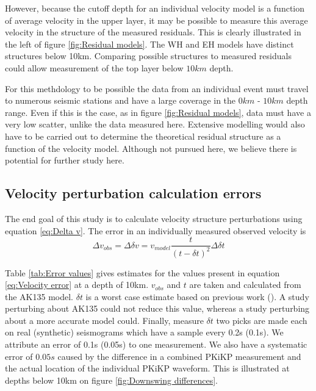 \documentclass[11pt,a4paper]{article}
\begin{document}
However, because the cutoff depth for an individual velocity model is a function of average velocity in the upper layer, it may be possible to measure this average velocity in the structure of the measured residuals. This is clearly illustrated in the left of figure \ref{fig:Residual models}. The WH and EH models have distinct structures below 10km. Comparing possible structures to measured residuals could allow measurement of the top layer below $10km$ depth.

For this methdology to be possible the data from an individual event must travel to numerous seismic stations and have a large coverage in the $0km$ - $10km$ depth range. Even if this is the case, as in figure \ref{fig:Residual models}, data must have a very low scatter, unlike the data measured here. Extensive modelling would also have to be carried out to determine the theoretical residual structure as a function of the velocity model. Although not pursued here, we believe there is potential for further study here.

\subsection{Velocity perturbation calculation errors}
\label{sec:Vel errors}
The end goal of this study is to calculate velocity structure perturbations using equation \eqref{eq:Delta v}. The error in an individually measured observed velocity is
\begin{equation}
	\Delta v_{obs} = \Delta \delta v = v_{model} \frac{t}{\left( t - \delta t\right )^{2}} \Delta \delta t 
	\label{eq:Velocity error}
\end{equation}

Table \ref{tab:Error values} gives estimates for the values present in equation \eqref{eq:Velocity error} at a depth of 10km. $v_{obs}$ and $t$ are taken and calculated from the AK135 model. $\delta t$ is a worst case estimate based on previous work (\cite{Waszek2011a}). A study perturbing about AK135 could not reduce this value, whereas a study perturbing about a more accurate model could. Finally, measure $\delta t$ two picks are made each on real (synthetic) seismograms which have a sample every 0.2s (0.1s). We attribute an error of 0.1s (0.05s) to one measurement. We also have a systematic error of $0.05s$ caused by the difference in a combined PKiKP measurement and the actual location of the individual PKiKP waveform. This is illustrated at depths below 10km on figure \ref{fig:Downswing differences}.
\end{document}
